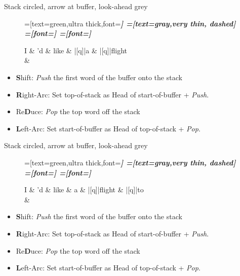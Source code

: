 \documentclass{lecture}
\begin{document}
\begin{plain}{Stack circled, arrow at buffer, look-ahead grey}
\begin{figure}
    \centering
    \begin{dependency}[theme=simple]
    =[text=green,ultra thick,font=\bfseries\itshape]
    =[text=gray,very thin, dashed]
    =[font=\bfseries\itshape]
    =[font=\itshape]
    \begin{deptext}[column sep=.075cm, row sep=.1ex]
        I \& 'd \& like \& |[q]|a \& |[q]|flight \\
         \& \\
    \end{deptext}
\end{dependency}
\end{figure}
    \begin{itemize}
        \item \textbf{S}hift: \emph{Push} the first word of the buffer onto the stack
    \item \textbf{R}ight-Arc: Set top-of-stack as Head of start-of-buffer + \emph{Push}.
    \item Re\textbf{D}uce: \emph{Pop} the top word off the stack
    \item \textbf{L}eft-Arc: Set start-of-buffer as Head of top-of-stack + \emph{Pop}.
    \end{itemize}
\end{plain}


\begin{plain}{Stack circled, arrow at buffer, look-ahead grey}
\begin{figure}
    \centering
    \begin{dependency}[theme=simple]
    =[text=green,ultra thick,font=\bfseries\itshape]
    =[text=gray,very thin, dashed]
    =[font=\bfseries\itshape]
    =[font=\itshape]
    \begin{deptext}[column sep=.075cm, row sep=.1ex]
        I \& 'd \& like \& a \& |[q]|flight \& |[q]|to \\
         \& \\
    \end{deptext}
\end{dependency}
\end{figure}
    \begin{itemize}
        \item \textbf{S}hift: \emph{Push} the first word of the buffer onto the stack
    \item \textbf{R}ight-Arc: Set top-of-stack as Head of start-of-buffer + \emph{Push}.
    \item Re\textbf{D}uce: \emph{Pop} the top word off the stack
    \item \textbf{L}eft-Arc: Set start-of-buffer as Head of top-of-stack + \emph{Pop}.
    \end{itemize}
\end{plain}
\end{document}

